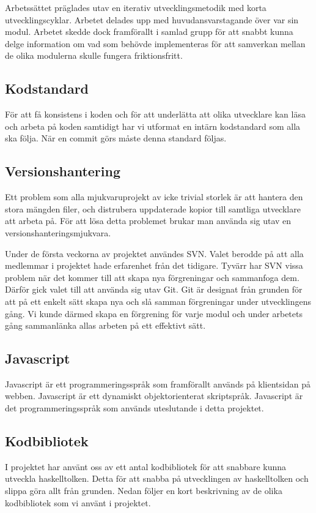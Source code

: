 Arbetssättet präglades utav en iterativ utvecklingsmetodik med korta utvecklingscyklar. Arbetet delades upp med huvudansvarstagande över var sin modul. Arbetet skedde dock framförallt i samlad grupp för att snabbt kunna delge information om vad som behövde implementeras för att samverkan mellan de olika modulerna skulle fungera friktionsfritt.

\subsection{Kodstandard} 
För att få konsistens i koden och för att underlätta att olika utvecklare kan läsa och arbeta på koden samtidigt har vi utformat en intärn kodstandard som alla ska följa.
När en commit görs måste denna standard följas.

\subsection{Versionshantering} 
Ett problem som alla mjukvaruprojekt av icke trivial storlek är att hantera den stora mängden filer, och distrubera uppdaterade kopior till samtliga utvecklare att arbeta på.
För att lösa detta problemet brukar man använda sig utav en versionshanteringsmjukvara. 

Under de första veckorna av projektet användes SVN. Valet berodde på att  alla medlemmar i projektet hade erfarenhet från det tidigare. Tyvärr har SVN vissa problem när det kommer till att skapa nya förgreningar och sammanfoga dem. Därför gick valet till att använda sig utav Git. Git är designat från grunden för att på ett enkelt sätt skapa nya och slå samman förgreningar under utvecklingens gång. Vi kunde därmed skapa en förgrening för varje modul och under arbetets gång sammanlänka allas arbeten på ett effektivt sätt. 

\subsection{Javascript} 
Javascript \citep{javascript} är ett programmeringsspråk som framförallt används på klientsidan på webben. Javascript är ett dynamiskt objektorienterat skriptspråk.
Javascript är det programmeringsspråk som används uteslutande i detta projektet.

\subsection{Kodbibliotek}
I projektet har använt oss av ett antal kodbibliotek för att snabbare kunna utveckla haskelltolken. Detta för att snabba på utvecklingen av haskelltolken och slippa göra allt från grunden.  
Nedan följer en kort beskrivning av de olika kodbibliotek som vi använt i projektet.

